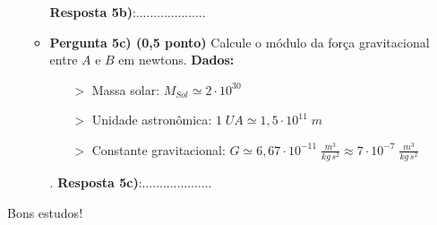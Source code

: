 \documentclass[a4paper, 12pt]{article}
\begin{document}
\begin{flushleft}
\begin{itemize}
\begin{itemize}
					\linebreak \linebreak \linebreak \linebreak \linebreak \linebreak \linebreak \linebreak \linebreak
					\textbf{Resposta 5b)}:....................
				\item \textbf{Pergunta 5c) (0,5 ponto)} Calcule o módulo da força gravitacional entre $A$ e $B$ em newtons. \linebreak
					\textbf{Dados:}
						\begin{itemize}
							\item[$>$] Massa solar: $M_{Sol} \simeq 2 \cdot 10^{30}$
							\item[$>$] Unidade astronômica: $1 \; UA \simeq 1,5 \cdot 10^{11} \; m$
							\item[$>$] Constante gravitacional: $G \simeq 6,67 \cdot 10^{-11} \; \frac{m^3}{kg \, s^2} \approx 7 \cdot 10^{-7} \; \frac{m^3}{kg \, s^2}$
						\end{itemize}
					.\linebreak \linebreak \linebreak \linebreak \linebreak \linebreak \linebreak \linebreak \linebreak \linebreak \linebreak
					\textbf{Resposta 5c)}:....................
			\end{itemize}
	\end{itemize}
	\end{flushleft}
	\begin{flushright}
		\begin{large}
			Bons estudos!
		\end{large}
	\end{flushright}
\end{document}
